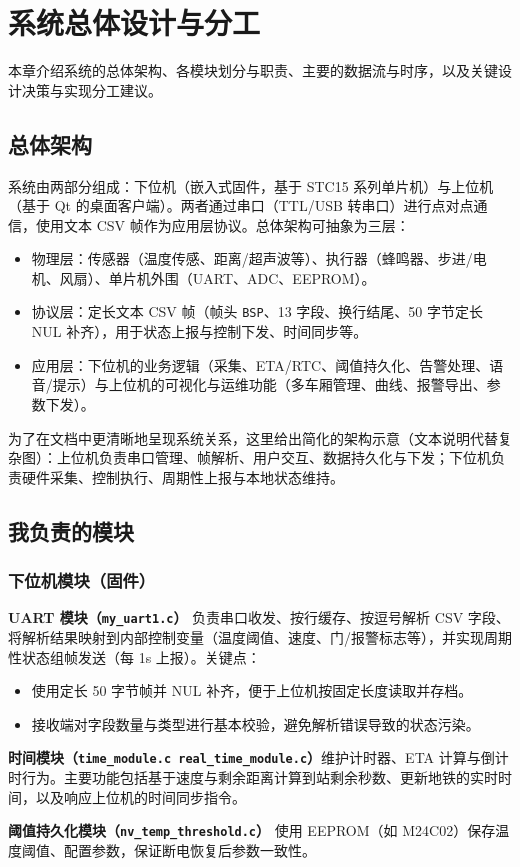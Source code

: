 \documentclass[12pt]{article}
\begin{document}
\section{系统总体设计与分工}
本章介绍系统的总体架构、各模块划分与职责、主要的数据流与时序，以及关键设计决策与实现分工建议。

\subsection{总体架构}
系统由两部分组成：下位机（嵌入式固件，基于 STC15 系列单片机）与上位机（基于 Qt 的桌面客户端）。两者通过串口（TTL/USB 转串口）进行点对点通信，使用文本 CSV 帧作为应用层协议。总体架构可抽象为三层：
\begin{itemize}
\item 物理层：传感器（温度传感、距离/超声波等）、执行器（蜂鸣器、步进/电机、风扇）、单片机外围（UART、ADC、EEPROM）。
\item 协议层：定长文本 CSV 帧（帧头 \texttt{BSP}、13 字段、换行结尾、50 字节定长 NUL 补齐），用于状态上报与控制下发、时间同步等。
\item 应用层：下位机的业务逻辑（采集、ETA/RTC、阈值持久化、告警处理、语音/提示）与上位机的可视化与运维功能（多车厢管理、曲线、报警导出、参数下发）。
\end{itemize}

为了在文档中更清晰地呈现系统关系，这里给出简化的架构示意（文本说明代替复杂图）：上位机负责串口管理、帧解析、用户交互、数据持久化与下发；下位机负责硬件采集、控制执行、周期性上报与本地状态维持。

\subsection{我负责的模块}

\subsubsection{下位机模块（固件）}
\begin{description}
\item \textbf{UART 模块（\texttt{my\_uart1.c}）} 负责串口收发、按行缓存、按逗号解析 CSV 字段、将解析结果映射到内部控制变量（温度阈值、速度、门/报警标志等），并实现周期性状态组帧发送（每 1s 上报）。关键点：
	\begin{itemize}
	\item 使用定长 50 字节帧并 NUL 补齐，便于上位机按固定长度读取并存档。
	\item 接收端对字段数量与类型进行基本校验，避免解析错误导致的状态污染。
	\end{itemize}
\item \textbf{时间模块（\texttt{time\_module.c real\_time\_module.c}）}维护计时器、ETA 计算与倒计时行为。主要功能包括基于速度与剩余距离计算到站剩余秒数、更新地铁的实时时间，以及响应上位机的时间同步指令。
\item \textbf{阈值持久化模块（\texttt{nv\_temp\_threshold.c}）} 使用 EEPROM（如 M24C02）保存温度阈值、配置参数，保证断电恢复后参数一致性。
\end{description}
\end{document}
